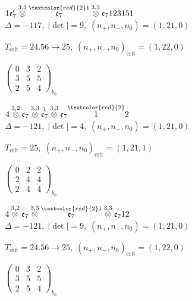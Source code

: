 \documentclass[10pt]{article}
\begin{document}
\smallskip

$1\mathfrak{e}_7'\overset{3,3}{\otimes}\overset{\textcolor{red}{2}1}{\mathfrak{e}_7}\overset{3,3}{\otimes}\mathfrak{e}_7123151$ \quad $\Delta=-117,\; |\det|=9,\; (n_+,n_-,n_0)=(1,21,0)$

\hspace{1em}$T_{\text{crit}}=24.56 \to 25,\; (n_+,n_-,n_0)_{\text{crit}}=(1,22,0)$

\hspace{2em}$\left(\begin{smallmatrix}0 & 3 & 2 \\ 3 & 5 & 5 \\ 2 & 5 & 4\end{smallmatrix}\right)_{\!b_0}$

\smallskip

$4\overset{3,2}{\otimes}\mathfrak{e}_7\overset{3,3}{\otimes}\overset{1}{\mathfrak{e}_7}\overset{3,3}{\otimes}\mathfrak{e}_7\overset{\textcolor{red}{2}}{1}2$ \quad $\Delta=-121,\; |\det|=4,\; (n_+,n_-,n_0)=(1,21,0)$

\hspace{1em}$T_{\text{crit}}=25,\; (n_+,n_-,n_0)_{\text{crit}}=(1,21,1)$

\hspace{2em}$\left(\begin{smallmatrix}0 & 2 & 2 \\ 2 & 4 & 4 \\ 2 & 4 & 4\end{smallmatrix}\right)_{\!b_0}$

$4\overset{3,2}{\otimes}\mathfrak{e}_7\overset{3,3}{\otimes}\overset{\textcolor{red}{2}1}{\mathfrak{e}_7}\overset{3,3}{\otimes}\mathfrak{e}_712$ \quad $\Delta=-121,\; |\det|=9,\; (n_+,n_-,n_0)=(1,21,0)$

\hspace{1em}$T_{\text{crit}}=24.56 \to 25,\; (n_+,n_-,n_0)_{\text{crit}}=(1,22,0)$

\hspace{2em}$\left(\begin{smallmatrix}0 & 3 & 2 \\ 3 & 5 & 5 \\ 2 & 5 & 4\end{smallmatrix}\right)_{\!b_0}$
\end{document}
